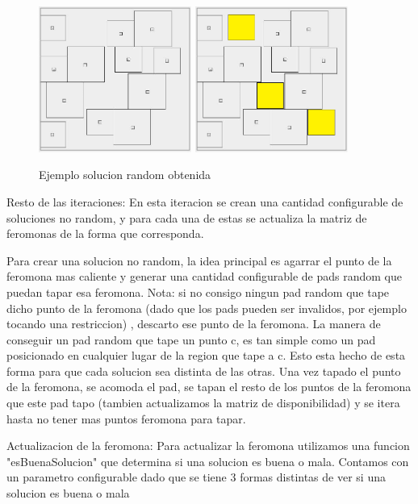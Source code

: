 \begin{center}
\begin{figure}[h]
\caption{Ejemplo solucion random obtenida}
\includegraphics[width=5cm]{imagenes/ejemplo2}
\includegraphics[width=5cm]{imagenes/ejemplo3}
\end{figure}
\end{center}




Resto de las iteraciones: En esta iteracion se crean una cantidad configurable de soluciones no random, y para cada una de estas se actualiza la matriz de feromonas de la forma que corresponda.

Para crear una solucion no random, la idea principal es agarrar el punto de la feromona mas caliente y generar una cantidad configurable de pads random que puedan tapar esa feromona. Nota: si no consigo ningun pad random que tape dicho punto de la feromona (dado que los pads pueden ser invalidos, por ejemplo tocando una restriccion) , descarto ese punto de la feromona. 
La manera de conseguir un pad random que tape un punto c, es tan simple como un pad posicionado en cualquier lugar de la region que tape a c. Esto esta hecho de esta forma para que cada solucion sea distinta de las otras.
Una vez tapado el punto de la feromona, se acomoda el pad, se tapan el resto de los puntos de la feromona que este pad tapo (tambien actualizamos la matriz de disponibilidad) y se itera hasta no tener mas puntos feromona para tapar. 

Actualizacion de la feromona: Para actualizar la feromona utilizamos una funcion "esBuenaSolucion" que determina si una solucion es buena o mala. Contamos con un parametro configurable dado que se tiene 3 formas distintas de ver si una solucion es buena o mala

